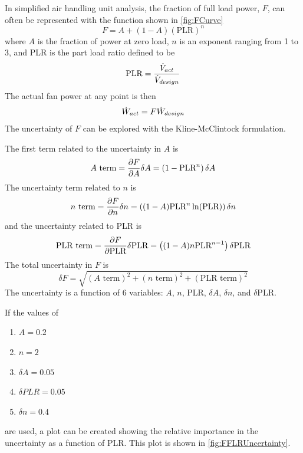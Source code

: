 In simplified air handling unit analysis, the fraction of full load
power, \(F\), can often be represented with the function shown in
\figref{} \ref{fig:FCurve}
\begin{equation}
    F = A + (1-A)( \text{PLR} )^{n}
\end{equation}
where \(A\) is the fraction of power at zero load, \(n\) is an exponent
ranging from 1 to 3, and PLR is the part load
ratio defined to be
\begin{equation}
    \text{PLR} = \frac{\dot{V}_{act}}{\dot{V}_{design}}
\end{equation}
The actual fan power at any point is then
\begin{equation}
    \dot{W}_{act}  = F \dot{W}_{design}
\end{equation}
The uncertainty of \(F\) can be explored with the Kline-McClintock
formulation.

The first term related to the uncertainty in \(A\) is
\begin{equation}
A \text{ term} = \pdv{F}{A} \delta A = \left(1-\text{PLR}^n\right) \delta A
\end{equation}
The uncertainty term related to \(n\) is
\begin{equation}
    n \text{ term} = \pdv{F}{n} \delta n = \left((1-A) \text{PLR}^n \ln (\text{PLR})\right) \delta n
\end{equation}
and the uncertainty related to PLR is
\begin{equation}
    \text{PLR term} = \pdv{F}{ \text{PLR}} \delta \text{PLR} = \left((1-A) n \text{PLR}^{n-1}\right) \delta \text{PLR}
\end{equation}
The total uncertainty in \(F\) is
\begin{equation}
    \delta F = \sqrt{ \left(A \text{ term}\right)^{2} + \left(n \text{ term}\right)^{2} + \left( \text{PLR term}\right)^{2} }
\end{equation}
The uncertainty is a function of 6 variables: \(A\), \(n\), PLR, \(\delta A\), \(\delta n\), and \(\delta\)PLR.

If the values of
\begin{enumerate}
    \item \(A=0.2\)
    \item \(n=2\)
    \item \(\delta A = 0.05\)
    \item \(\delta PLR = 0.05\)
    \item \(\delta n = 0.4\)
\end{enumerate}
are used, a plot can be created showing the relative importance in the
uncertainty as a function of PLR. This plot is shown in \figref{}
\ref{fig:FFLRUncertainty}.

